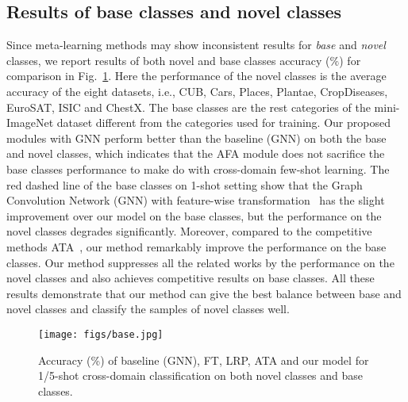 \documentclass[runningheads]{utils/llncs}
\begin{document}
\subsection{Results of base classes and novel classes}
Since meta-learning methods may show inconsistent results for \textit{base} and \textit{novel} classes, we report results of both novel and base classes accuracy ($\%$) for comparison in Fig.~\ref{figure2}.
Here the performance of the novel classes is the average accuracy of the eight datasets, i.e., CUB, Cars, Places, Plantae, CropDiseases, EuroSAT, ISIC and ChestX.
The base classes are the rest categories of the mini-ImageNet dataset different from the categories used for training. 
Our proposed modules with GNN perform better than the baseline (GNN)  on both the base and novel classes, which indicates that the AFA module does not sacrifice the base classes performance to make do with cross-domain few-shot learning.
The red dashed line of the base classes on 1-shot setting show that the Graph Convolution Network (GNN) with feature-wise transformation~\cite{TsengLH020} has the slight improvement over our model on the base classes, but the performance on the novel classes degrades significantly. 
Moreover, compared to the competitive methods ATA~\cite{WangD21}, our method remarkably improve the performance on the base classes.
Our method suppresses all the related works by the performance on the novel classes and also achieves competitive results on base classes.
All these results demonstrate that our method can give the best balance between base and novel classes and classify the samples of novel classes well.

\begin{figure}[t]
\begin{center}
\texttt{[image: figs/base.jpg]}
\caption{Accuracy (\%) of baseline (GNN), FT, LRP, ATA and our model for 1/5-shot cross-domain classification on both novel classes and base classes. 
   }
\label{figure2}
\end{center}
\end{figure} 
\end{document}
